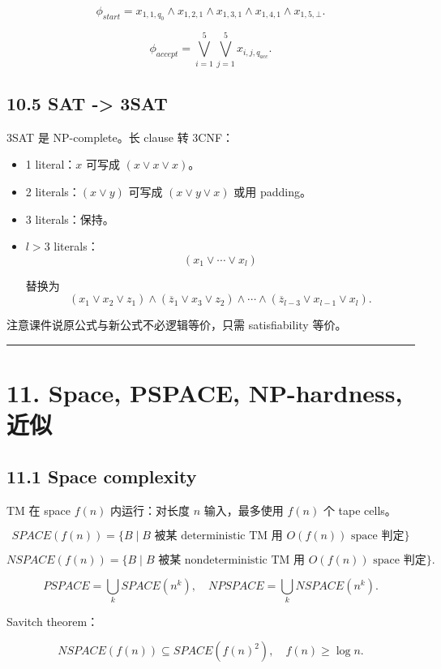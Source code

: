 ﻿\documentclass[UTF8,11pt]{ctexart}
\begin{document}
\[
\phi_{start}=x_{1,1,q_0}\land x_{1,2,1}\land x_{1,3,1}\land x_{1,4,1}\land x_{1,5,\bot}.
\]

\[
\phi_{accept}=\bigvee_{i=1}^{5}\bigvee_{j=1}^{5}x_{i,j,q_{acc}}.
\]


\subsection{10.5 SAT -> 3SAT}


3SAT 是 NP-complete。长 clause 转 3CNF：


\begin{itemize}
\item 1 literal：\(x\) 可写成 \((x\vee x\vee x)\)。
\item 2 literals：\((x\vee y)\) 可写成 \((x\vee y\vee x)\) 或用 padding。
\item 3 literals：保持。
\item \(l>3\) literals：
\[
  (x_1\vee\cdots\vee x_l)
  \]

替换为
\[
  (x_1\vee x_2\vee z_1)\wedge(\overline z_1\vee x_3\vee z_2)\wedge\cdots
  \wedge(\overline z_{l-3}\vee x_{l-1}\vee x_l).
  \]

\end{itemize}

注意课件说原公式与新公式不必逻辑等价，只需 satisfiability 等价。


\bigskip\hrule\bigskip


\section{11. Space, PSPACE, NP-hardness, 近似}


\subsection{11.1 Space complexity}


TM 在 space \(f(n)\) 内运行：对长度 \(n\) 输入，最多使用 \(f(n)\) 个 tape cells。


\[
SPACE(f(n))=\{B\mid B\text{ 被某 deterministic TM 用 }O(f(n))\text{ space 判定}\}
\]

\[
NSPACE(f(n))=\{B\mid B\text{ 被某 nondeterministic TM 用 }O(f(n))\text{ space 判定}\}.
\]


\[
PSPACE=\bigcup_k SPACE(n^k),\quad NPSPACE=\bigcup_k NSPACE(n^k).
\]


Savitch theorem：

\[
NSPACE(f(n))\subseteq SPACE(f(n)^2),\quad f(n)\ge\log n.
\]
\end{document}
